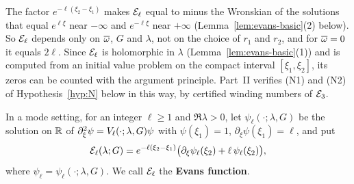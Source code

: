 The factor $e^{-\ell(\xi_2-\xi_1)}$ makes $\mathcal{E}_\ell$ equal to minus the
Wronskian of the solutions that equal $e^{\ell\xi}$ near $-\infty$ and
$e^{-\ell\xi}$ near $+\infty$ (Lemma~\ref{lem:evans-basic}(2) below). So
$\mathcal{E}_\ell$ depends only on $\overline{\omega}$, $G$ and $\lambda$, not on the choice of
$r_1$ and $r_2$, and for $\overline{\omega}=0$ it equals $2\ell$. Since $\mathcal{E}_\ell$ is
holomorphic in $\lambda$ (Lemma~\ref{lem:evans-basic}(1)) and is computed from an
initial value problem on the compact interval $[\xi_1,\xi_2]$, its zeros can be
counted with the argument principle. Part~II verifies \textup{(N1)} and
\textup{(N2)} of Hypothesis~\ref{hyp:N} below in this way, by certified winding
numbers of $\mathcal{E}_3$.

\begin{definition}
\label{def:evans}
In a mode setting, for an integer $\ell\ge1$ and $\Re\lambda>0$, let
$\psi_\ell(\cdot;\lambda,G)$ be the solution on $\mathbb{R}$ of
$\partial_\xi^2\psi=V_\ell(\cdot;\lambda,G)\psi$ with $\psi(\xi_1)=1$, $\partial_\xi\psi(\xi_1)=\ell$,
and put
\[
\mathcal{E}_\ell(\lambda;G)=e^{-\ell(\xi_2-\xi_1)}\big(\partial_\xi\psi_\ell(\xi_2)+\ell\,\psi_\ell(\xi_2)\big),
\]
where $\psi_\ell=\psi_\ell(\cdot;\lambda,G)$. We call $\mathcal{E}_\ell$ the
\textbf{Evans function}.
\end{definition}

